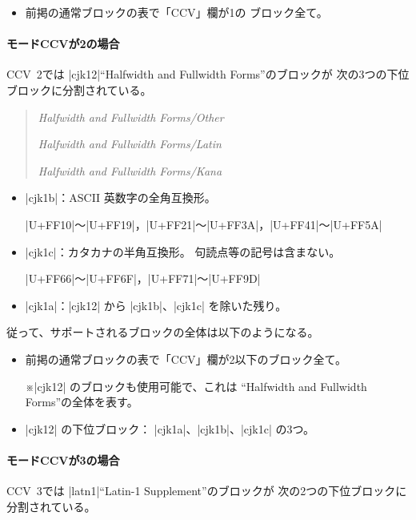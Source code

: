 \documentclass[uplatex,dvipdfmx,a4paper]{jsarticle}
\newcommand{\Note}{\par\noindent ※}
\newcommand{\Means}{：\quad}
\begin{document}
\begin{itemize}
\item 前掲の通常ブロックの表で「CCV」欄が1の
  ブロック全て。
\end{itemize}

\paragraph{モードCCVが2の場合}

CCV~2では |cjk12|“Halfwidth and Fullwidth Forms”のブロックが
次の3つの下位ブロックに分割されている。

\begin{quotation}
  \newcommand\xE[2]{\noindent
    \makebox[4em][l]{\texttt{#1}}\textsl{#2}\par}
  \xE{cjk1a}{Halfwidth and Fullwidth Forms/Other}
  \xE{cjk1b}{Halfwidth and Fullwidth Forms/Latin}
  \xE{cjk1c}{Halfwidth and Fullwidth Forms/Kana}
\end{quotation}

\begin{itemize}
\item |cjk1b|\Means ASCII 英数字の全角互換形。\par
  |U+FF10|～|U+FF19|，|U+FF21|～|U+FF3A|，|U+FF41|～|U+FF5A|
\item |cjk1c|\Means カタカナの半角互換形。
  句読点等の記号は含まない。\par
  |U+FF66|～|U+FF6F|，|U+FF71|～|U+FF9D|
\item |cjk1a|\Means |cjk12| から |cjk1b|、|cjk1c| を除いた残り。
\end{itemize}

従って、サポートされるブロックの全体は以下のようになる。

\begin{itemize}
\item 前掲の通常ブロックの表で「CCV」欄が2以下のブロック全て。
  \Note |cjk12| のブロックも使用可能で、これは
  “Halfwidth and Fullwidth Forms”の全体を表す。
\item |cjk12| の下位ブロック\Means
  |cjk1a|、|cjk1b|、|cjk1c| の3つ。
\end{itemize}


\paragraph{モードCCVが3の場合}

CCV~3では |latn1|“Latin-1 Supplement”のブロックが
次の2つの下位ブロックに分割されている。
\end{document}

